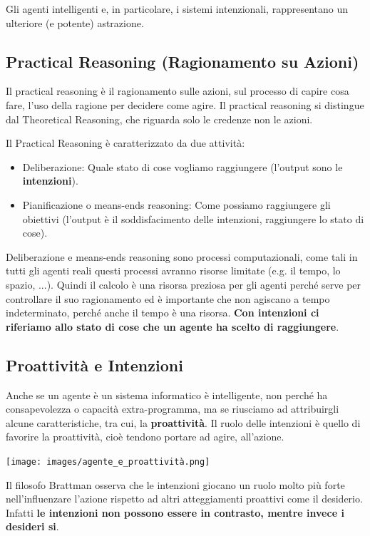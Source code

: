 Gli agenti intelligenti e, in particolare, i sistemi intenzionali, rappresentano un ulteriore (e
potente) astrazione.

\subsection{Practical Reasoning (Ragionamento su Azioni)}
Il practical reasoning è il ragionamento sulle azioni, sul processo di capire cosa fare, l'uso della ragione per decidere come agire. Il practical reasoning si distingue dal Theoretical Reasoning, che riguarda solo le credenze non le azioni. 

Il Practical Reasoning è caratterizzato da due attività:
\begin{itemize}
    \item Deliberazione: Quale stato di cose vogliamo raggiungere (l'output sono le \textbf{intenzioni}).
    \item Pianificazione o means-ends reasoning: Come possiamo raggiungere gli obiettivi (l'output è il soddisfacimento delle intenzioni, raggiungere lo stato di cose).
\end{itemize}

Deliberazione e means-ends reasoning sono processi computazionali, come tali in tutti gli agenti reali questi processi avranno risorse limitate (e.g. il tempo, lo spazio, ...). Quindi il calcolo è una risorsa preziosa per gli agenti perché serve per controllare il suo ragionamento ed è importante che non agiscano a tempo indeterminato, perché anche il tempo è una risorsa.
\textbf{Con intenzioni ci riferiamo allo stato di cose che un agente ha scelto di raggiungere}.

\subsection{Proattività e Intenzioni}
Anche se un agente è un sistema informatico è intelligente, non perché ha consapevolezza o capacità extra-programma, ma se riusciamo ad attribuirgli alcune caratteristiche, tra cui, la \textbf{proattività}. 
Il ruolo delle intenzioni è quello di favorire la proattività, cioè tendono portare ad agire, all’azione.
\begin{center}
    \texttt{[image: images/agente\_e\_proattività.png]}
\end{center}

Il filosofo Brattman osserva che le intenzioni giocano un ruolo molto più forte nell’influenzare l’azione rispetto ad altri atteggiamenti proattivi come il desiderio. Infatti \textbf{le intenzioni non possono essere in contrasto, mentre invece i desideri si}.

